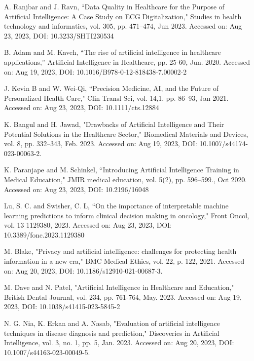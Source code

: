 \documentclass{ieeeaccess}
\begin{document}
\begin{thebibliography}{00}

 A. Ranjbar and J. Ravn, “Data Quality in Healthcare for the Purpose of Artificial Intelligence: A Case Study on ECG Digitalization," Studies in health technology and informatics, vol. 305, pp. 471–474, Jun 2023. Accessed on: Aug 23, 2023, DOI: 10.3233/SHTI230534

 B. Adam and M. Kaveh, “The rise of artificial intelligence in healthcare applications,” Artificial Intelligence in Healthcare, pp. 25-60, Jun. 2020. Accessed on: Aug 19, 2023, DOI: 10.1016/B978-0-12-818438-7.00002-2 

 J. Kevin B and W. Wei‐Qi, “Precision Medicine, AI, and the Future of Personalized Health Care," Clin Transl Sci, vol. 14,1, pp. 86–93, Jan 2021. Accessed on: Aug 23, 2023, DOI: 10.1111/cts.12884

 K. Bangul and H. Jawad, "Drawbacks of Artificial Intelligence and Their Potential Solutions in the Healthcare Sector," Biomedical Materials and Devices, vol. 8, pp. 332–343, Feb. 2023. Accessed on: Aug 19, 2023, DOI: 10.1007/s44174-023-00063-2.

 K. Paranjape and M. Schinkel, “Introducing Artificial Intelligence Training in Medical Education," JMIR medical education, vol. 5(2), pp. 596–599., Oct 2020. Accessed on: Aug 23, 2023, DOI: 10.2196/16048

 Lu, S. C. and Swisher, C. L, “On the importance of interpretable machine learning predictions to inform clinical decision making in oncology," Front Oncol, vol. 13 1129380, 2023. Accessed on: Aug 23, 2023, DOI: 10.3389/fonc.2023.1129380

 M. Blake, "Privacy and artificial intelligence: challenges for protecting health information in a new era," BMC Medical Ethics, vol. 22, p. 122, 2021. Accessed on: Aug 20, 2023, DOI: 10.1186/s12910-021-00687-3.

 M. Dave and N. Patel, "Artificial Intelligence in Healthcare and Education," British Dental Journal, vol. 234, pp. 761-764, May. 2023. Accessed on: Aug 19, 2023, DOI: 10.1038/s41415-023-5845-2 

 N. G. Nia, K. Erkan and A. Nasab, "Evaluation of artificial intelligence techniques in disease diagnosis and prediction," Discoveries in Artificial Intelligence, vol. 3, no. 1, pp. 5, Jan. 2023. Accessed on: Aug 20, 2023, DOI: 10.1007/s44163-023-00049-5.


\end{thebibliography}
\end{document}
